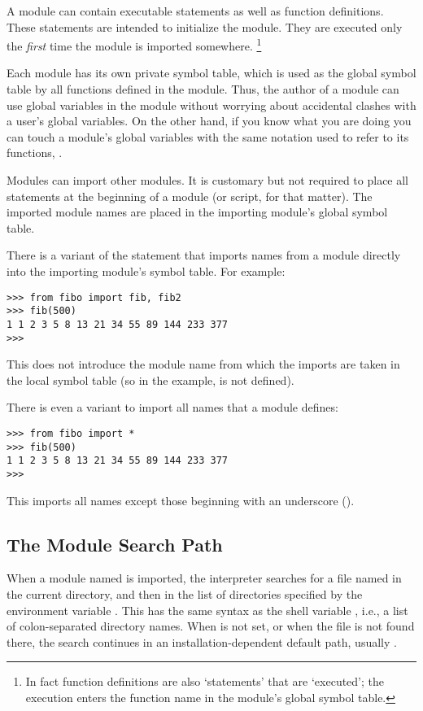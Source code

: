 A module can contain executable statements as well as function
definitions.
These statements are intended to initialize the module.
They are executed only the
\emph{first}
time the module is imported somewhere.%
\footnote{
        In fact function definitions are also `statements' that are
        `executed'; the execution enters the function name in the
        module's global symbol table.
}

Each module has its own private symbol table, which is used as the
global symbol table by all functions defined in the module.
Thus, the author of a module can use global variables in the module
without worrying about accidental clashes with a user's global
variables.
On the other hand, if you know what you are doing you can touch a
module's global variables with the same notation used to refer to its
functions,
.

Modules can import other modules.
It is customary but not required to place all
statements at the beginning of a module (or script, for that matter).
The imported module names are placed in the importing module's global
symbol table.

There is a variant of the
statement that imports names from a module directly into the importing
module's symbol table.
For example:

\bcode\begin{verbatim}
>>> from fibo import fib, fib2
>>> fib(500)
1 1 2 3 5 8 13 21 34 55 89 144 233 377
>>> 
\end{verbatim}\ecode
%
This does not introduce the module name from which the imports are taken
in the local symbol table (so in the example,  is not
defined).

There is even a variant to import all names that a module defines:

\bcode\begin{verbatim}
>>> from fibo import *
>>> fib(500)
1 1 2 3 5 8 13 21 34 55 89 144 233 377
>>> 
\end{verbatim}\ecode
%
This imports all names except those beginning with an underscore
(\code{_}).

\subsection{The Module Search Path}

When a module named  is imported, the interpreter searches
for a file named  in the current directory,
and then in the list of directories specified by
the environment variable .  This has the same syntax as
the \UNIX{} shell variable , i.e., a list of colon-separated
directory names.  When  is not set, or when the file
is not found there, the search continues in an installation-dependent
default path, usually .

